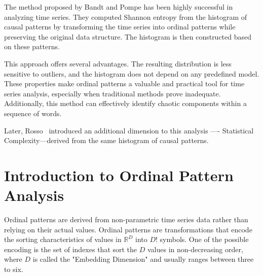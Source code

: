 The method proposed by Bandt and Pompe has been highly successful in analyzing time series. They computed Shannon entropy from the histogram of causal patterns by transforming the time series into ordinal patterns while preserving the original data structure. 
The histogram is then constructed based on these patterns.

This approach offers several advantages. 
The resulting distribution 
is less sensitive to outliers, and the histogram does not depend on any predefined model. These properties make ordinal patterns a valuable and practical tool for time series analysis, especially when traditional methods prove inadequate. Additionally, this method can effectively identify chaotic components within a sequence of words.

Later, Rosso~\cite{Rosso2007}
introduced an additional dimension to this analysis —- Statistical Complexity—derived from the same histogram of causal patterns.

\section*{Introduction to Ordinal Pattern Analysis}

Ordinal patterns are derived from non-parametric time series data rather than relying on their actual values. 
Ordinal patterns are transformations that encode the sorting characteristics of values in $\mathbb{R}^D$ into $D!$ symbols.
One of the possible encoding is the set of indexes that sort the $D$ values in non-decreasing order, where $D$ is called the
"Embedding Dimension" and usually ranges between three to six.  

